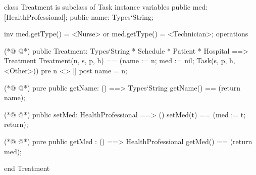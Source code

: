 \begin{vdmpp}[breaklines=true]
class Treatment is subclass of Task
instance variables
  public med: [HealthProfessional];
  public name: Types`String;
  
  inv med.getType() = <Nurse> or med.getType() = <Technician>;
operations

(*@
\label{Treatment:9}
@*)
 public Treatment: Types`String * Schedule * Patient * Hospital ==> Treatment
  Treatment(n, s, p, h) == (name := n; med := nil; Task(s, p, h, <Other>))
 pre n <> []
 post name = n;
 
(*@
\label{getName:14}
@*)
 pure public getName: () ==> Types`String
  getName() == (return name);
  
(*@
\label{setMed:17}
@*)
 public setMed: HealthProfessional ==> ()
  setMed(t) == (med := t; return);
 
(*@
\label{getMed:20}
@*)
 pure public getMed : () ==> HealthProfessional
  getMed() == (return med);

end Treatment
\end{vdmpp}
